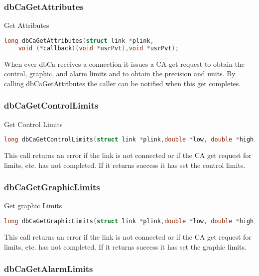 \subsubsection{dbCaGetAttributes}

Get Attributes

\begin{lstlisting}[language=C]
long dbCaGetAttributes(struct link *plink,
    void (*callback)(void *usrPvt),void *usrPvt);
\end{lstlisting}

When ever dbCa receives a connection it issues a CA get request to obtain the control, graphic, and alarm limits and to obtain the precision and units.
By calling dbCaGetAttributes the caller can be notified when this get completes.

\subsubsection{dbCaGetControlLimits}

Get Control Limits

\begin{lstlisting}[language=C]
long dbCaGetControlLimits(struct link *plink,double *low, double *high);
\end{lstlisting}

This call returns an error if the link is not connected or if the CA get request for limits, etc. has not completed.
If it returns success it has set the control limits.

\subsubsection{dbCaGetGraphicLimits}

Get graphic Limits

\begin{lstlisting}[language=C]
long dbCaGetGraphicLimits(struct link *plink,double *low, double *high);
\end{lstlisting}

This call returns an error if the link is not connected or if the CA get request for limits, etc. has not completed.
If it returns success it has set the graphic limits.

\subsubsection{dbCaGetAlarmLimits}

